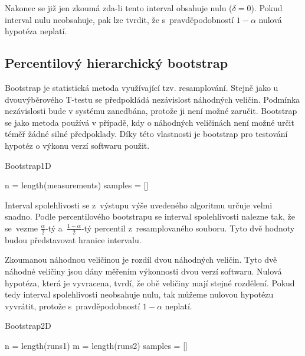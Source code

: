 Nakonec se již jen zkoumá zda-li tento interval obsahuje nulu ($\delta = 0$).
Pokud interval nulu neobsahuje, pak lze tvrdit, že s~pravděpodobností $1-\alpha$
nulová hypotéza neplatí.

\subsection{Percentilový hierarchický bootstrap}


Bootstrap je statistická metoda využívající tzv. resamplování.
Stejně jako u dvouvýběrového T-testu se předpokládá nezávislost náhodných veličin.
Podmínka nezávislosti bude v systému zanedbána, protože ji není možné zaručit.
Bootstrap se jako metoda používá v případě, kdy o náhodných veličinách není možné
určit téměř žádné silné předpoklady. Díky této vlastnosti je bootstrap pro testování
hypotéz o výkonu verzí softwaru použit.

\begin{algorithm}[h!]
    \caption{Bootstrap1D}
    
    n = length(measurements)\;
    samples = []\;

    
    \;
\end{algorithm}

Interval spolehlivosti se z~výstupu výše uvedeného algoritmu určuje velmi snadno.
Podle percentilového bootstrapu se interval spolehlivosti nalezne tak, že se~vezme $\frac{\alpha}{2}$-tý
a~$\frac{1-\alpha}{2}$-tý percentil z~resamplovaného souboru. Tyto dvě hodnoty budou představovat hranice intervalu.

Zkoumanou náhodnou veličinou je rozdíl dvou náhodných veličin. Tyto dvě náhodné veličiny jsou dány měřením
výkonnosti dvou verzí softwaru. Nulová hypotéza, která je vyvracena, tvrdí, že obě veličiny mají stejné rozdělení.
Pokud tedy interval spolehlivosti neobsahuje nulu, tak můžeme nulovou hypotézu vyvrátit, protože s~pravděpodobností
$1-\alpha$ neplatí.

\begin{algorithm}[h!]
    \caption{Bootstrap2D}
    
    n = length(runs1)\;
    m = length(runs2)\;
    samples = []\;

    
    \;
\end{algorithm}

